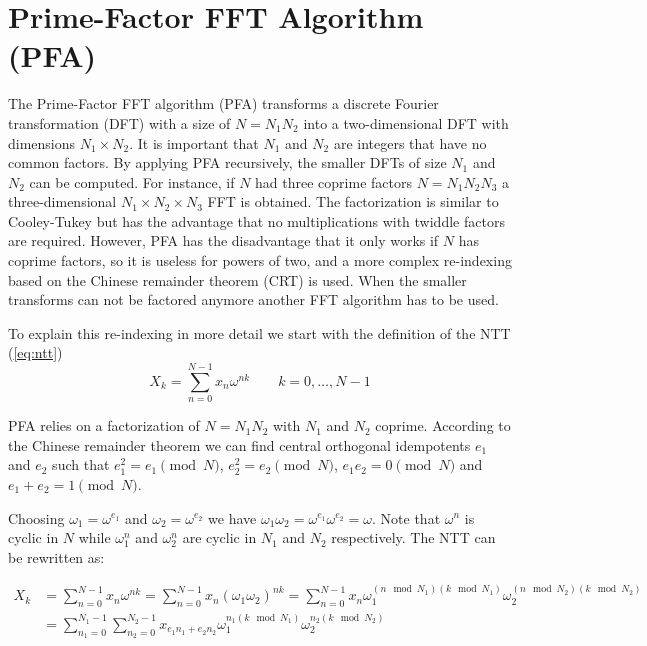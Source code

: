 \documentclass[english,master=eelt,masteroption=ec]{kulemt}
\begin{document}
\section{Prime-Factor FFT Algorithm (PFA)}

The Prime-Factor FFT algorithm (PFA) transforms a discrete Fourier transformation (DFT) with a size of $N = N_1 N_2$ into a two-dimensional DFT with dimensions $N_1 \times N_2$. \cite{1671829} It is important that $N_1$ and $N_2$ are integers that have no common factors. By applying PFA recursively, the smaller DFTs of size $N_1$ and $N_2$ can be computed. For instance, if $N$ had three coprime factors $N = N_1 N_2 N_3$ a three-dimensional $N_1 \times N_2 \times N_3$ FFT is obtained. The factorization is similar to Cooley-Tukey but has the advantage that no multiplications with twiddle factors are required. However, PFA has the disadvantage that it only works if $N$ has coprime factors, so it is useless for powers of two, and a more complex re-indexing based on the Chinese remainder theorem (CRT) is used. When the smaller transforms can not be factored anymore another FFT algorithm has to be used.

To explain this re-indexing in more detail we start with the definition of the NTT (\ref{eq:ntt})
\[X_k = \sum_{n=0}^{N-1} x_n \omega^{nk} \qquad k=0,\ldots,N-1\]

PFA relies on a factorization of $N = N_1 N_2$ with $N_1$ and $N_2$ coprime.
According to the Chinese remainder theorem we can find central orthogonal idempotents $e_1$ and $e_2$ such that $e_1^2 = e_1 \pmod{N}$,  $e_2^2 = e_2 \pmod{N}$, $e_1 e_2 = 0 \pmod{N}$ and $e_1 + e_2 = 1 \pmod{N}$.

Choosing $\omega_1 = \omega^{e_1}$ and $\omega_2 = \omega^{e_2}$ we have $\omega_1 \omega_2 = \omega^{e_1} \omega^{e_2} = \omega$. Note that $\omega^n$ is cyclic in $N$ while $\omega_1^n$ and $\omega_2^n$ are cyclic in $N_1$ and $N_2$ respectively. The NTT can be rewritten as:

\begin{equation}
\begin{split}
X_k &= \sum_{n=0}^{N-1} x_n \omega^{nk} = \sum_{n=0}^{N-1} x_n \left( \omega_1 \omega_2 \right)^{nk} = \sum_{n=0}^{N-1} x_n \omega_1^{(n \mod N_1)(k \mod N_1)} \omega_2^{(n \mod N_2)(k \mod N_2)} \\
&= \sum_{n_1=0}^{N_1-1}\sum_{n_2=0}^{N_2-1} x_{e_1 n_1 + e_2 n_2} \omega_1^{n_1 (k \mod N_1)} \omega_2^{n_2(k \mod N_2)}
\end{split}
\end{equation}
\end{document}
